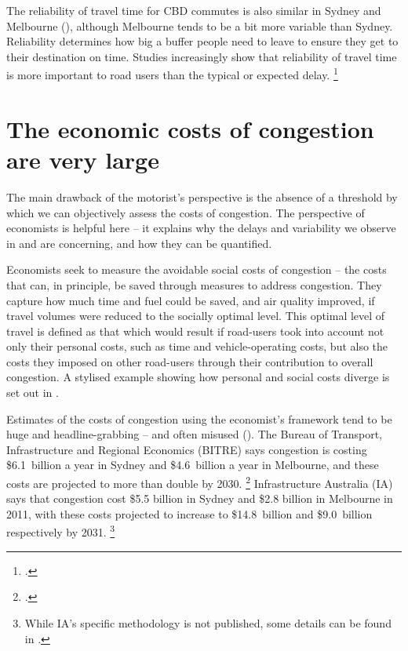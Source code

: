 \documentclass{grattan}
\begin{document}
The reliability of travel time for CBD commutes is also similar in Sydney and Melbourne (), although Melbourne tends to be a bit more variable than Sydney. Reliability determines how big a buffer people need to leave to ensure they get to their destination on time. Studies increasingly show that reliability of travel time is more important to road users than the typical or expected delay.%
    \footcites{2005-Small-estimates-for-travel-time-and-reliability}{2017-Brent-and-Gross-value-of-travel-time-and-reliability}{Cortright-2017-CityObs-What-hot-lanes-reveal-about-the-value-of-travel-time}


\section{The economic costs of congestion are very large}\label{subsec:economists-think-costs-are-very-large}

The main drawback of the motorist's perspective is the absence of a threshold by which we can objectively assess the costs of congestion. The perspective of economists is helpful here -- it explains why the delays and variability we observe in  and  are concerning, and how they can be quantified.

Economists seek to measure the avoidable social costs of congestion -- the costs that can, in principle, be saved through measures to address congestion.
They capture how much time and fuel could be saved, and air quality improved, if travel volumes were reduced to the socially optimal level.
This optimal level of travel is defined as that which would result if road-users took into account not only their personal costs, such as time and vehicle-operating costs, but also the costs they imposed on other road-users through their contribution to overall congestion. A stylised example showing how personal and social costs diverge is set out in .

Estimates of the costs of congestion using the economist's framework tend to be huge and headline-grabbing -- and often misused (). The Bureau of Transport, Infrastructure and Regional Economics (BITRE) says congestion is costing \$6.1~billion a year in Sydney and \$4.6~billion a year in Melbourne, and these costs are projected to more than double by 2030.%
    \footcite[][1]{BITRE-2015-Traffic-and-congestion-cost-trends-for-Aust-capital-cities}
Infrastructure Australia (IA) says that congestion cost \$5.5 billion in Sydney and \$2.8 billion in Melbourne in 2011, with these costs projected to increase to \$14.8~billion and \$9.0~billion respectively by 2031.%
    \footnote{While IA's specific methodology is not published, some details can be found in \textcite[][379--393]{Acil-Allen-report-for-Infrastructure-Australia-National-Infrastructure-Audit}.}
\end{document}
